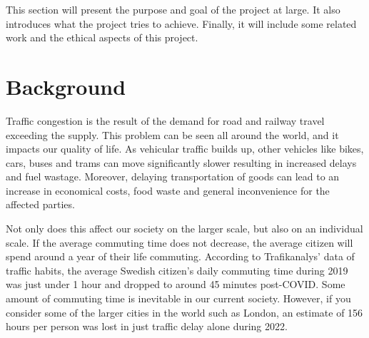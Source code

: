 This section will present the purpose and goal of the project at large. It also introduces what the project tries to achieve. Finally, it will include some related work and the ethical aspects of this project.
\section{Background}
    Traffic congestion is the result of the demand for road and railway travel exceeding the supply. This problem can be seen all around the world\cite{inrix}, and it impacts our quality of life. As vehicular traffic builds up, other vehicles like bikes, cars, buses and trams can move significantly slower resulting in increased delays and fuel wastage. Moreover, delaying transportation of goods can lead to an increase in economical costs, food waste and general inconvenience for the affected parties.

    Not only does this affect our society on the larger scale, but also on an individual scale. If the average commuting time does not decrease, the average citizen will spend around a year of their life commuting. According to Trafikanalys' data of traffic habits\cite{trafikanalys_2022}, the average Swedish citizen's daily commuting time during 2019 was just under 1 hour and dropped to around 45 minutes post-COVID. Some amount of commuting time is inevitable in our current society. However, if you consider some of the larger cities in the world such as London, an estimate of 156 hours per person was lost in just traffic delay alone during 2022\cite{inrix}.

